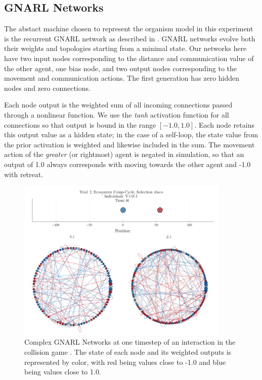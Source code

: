 \documentclass{article}
\begin{document}
\subsection*{GNARL Networks}
The abstact machine chosen to represent the organism model in this experiment is the recurrent GNARL
network as described in \cite{angeline1994}. GNARL networks evolve both their weights and 
topologies starting from a minimal state. Our networks here have two input nodes corresponding 
to the distance and communication value of the other agent, one bias node, and two output nodes 
corresponding to the movement and communication actions. The first generation has zero hidden 
nodes and zero connections.

Each node output is the weighted sum of all incoming connections passed through a nonlinear 
function. We use the \textit{tanh} activation function for all connections so that output is 
bound in the range $[-1.0, 1.0]$. Each node retains this output value as a hidden state; in the 
case of a self-loop, the state value from the prior activation is weighted and likewise included 
in the sum. The movement action of the \textit{greater} (or rightmost) agent is negated in simulation, 
so that an output of 1.0 always corresponds with moving towards the other agent and -1.0 with retreat. 

\begin{figure}[H]
    \begin{center}
        \includegraphics[width=4in]{gnarl.png}
        \caption{Complex GNARL Networks at one timestep of an interaction in the collision game
        \citep{willkens2022}. The state of each node and its weighted outputs is represented by 
        color, with red being values close to -1.0 and blue being values close to 1.0.}
        \label{gnarl}
    \end{center}
\end{figure}
\end{document}
